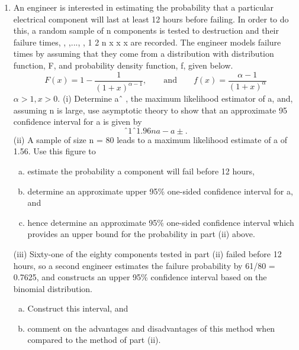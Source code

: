 \documentclass[a4paper,12pt]{article}
\begin{document}
\begin{enumerate}
\item  An engineer is interested in estimating the probability that a particular
electrical component will last at least 12 hours before failing. In order to do
this, a random sample of n components is tested to destruction and their
failure times, , ,..., , 1 2 n x x x are recorded. The engineer models failure times by
assuming that they come from a distribution with distribution function, F, and
probability density function, f, given below.
\[F(x) = 1 − \frac{1}{(1+x)^{\alpha − 1}}, \qquad \mbox{and} \qquad  f(x) = \frac{\alpha − 1}{( 1 + x )^\alpha}\]
$\alpha > 1, x > 0$.
(i) Determine aˆ , the maximum likelihood estimator of a, and, assuming n
is large, use asymptotic theory to show that an approximate 95%
confidence interval for a is given by
\[ˆ 1 ˆ 1.96
n
a -
a ± . \]
(ii) A sample of size n = 80 leads to a maximum likelihood estimate of a of
1.56. Use this figure to
\begin{enumerate}[(a)]
\item estimate the probability a component will fail before 12 hours,
\item determine an approximate upper 95\% one-sided confidence
interval for a, and
\item hence determine an approximate 95\% one-sided confidence
interval which provides an upper bound for the probability in
part (ii) above. 
\end{enumerate}
(iii) Sixty-one of the eighty components tested in part (ii) failed before 12
hours, so a second engineer estimates the failure probability by
61/80 = 0.7625, and constructs an upper 95\% confidence interval based
on the binomial distribution.
\begin{enumerate}[(a)]
\item Construct this interval, and
\item comment on the advantages and disadvantages of this method
when compared to the method of part (ii). 
\end{enumerate}
\end{enumerate}
\newpage
\end{document}

